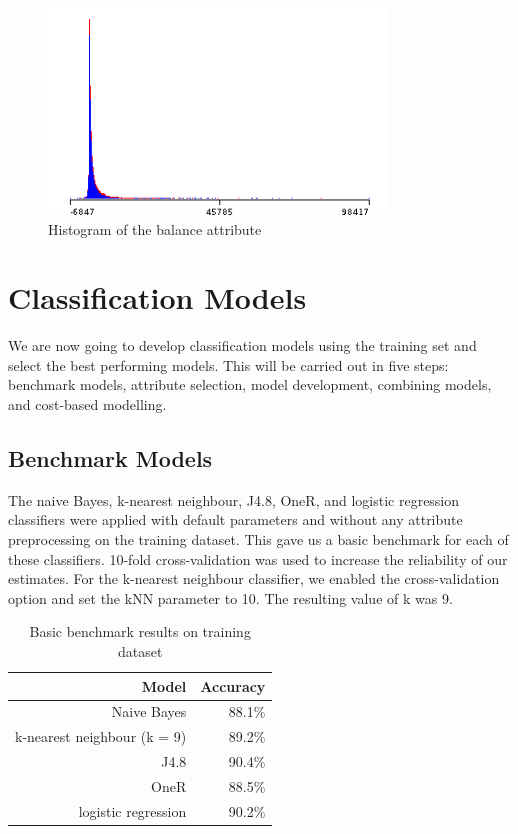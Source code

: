 \documentclass[a4paper,11pt]{article}
\begin{document}
\begin{figure}[H]
  \centering
  \includegraphics[width=0.8\textwidth]{pictures/balanceHistogram.png}
  \caption{Histogram of the balance attribute}
  \label{fig:balanceHistogram}
\end{figure}

\section{Classification Models}

We are now going to develop classification models using the training set and select the best performing models. This
will be carried out in five steps: benchmark models, attribute selection, model development, combining models, and
cost-based modelling.

\subsection{Benchmark Models}

The naive Bayes, k-nearest neighbour, J4.8, OneR, and logistic regression classifiers were applied with default parameters
and without any attribute preprocessing on the training dataset. This gave us a basic benchmark for each of these classifiers.
10-fold cross-validation was used to increase the reliability of our estimates. For the k-nearest neighbour classifier, 
we enabled the cross-validation option and set the kNN parameter to 10. The resulting value of k was 9.

\begin{table}[H]
  \begin{center}
    \begin{tabular}{r | r}
      Model & Accuracy  \\ \hline
      Naive Bayes & 88.1\% \\
      k-nearest neighbour (k = 9) & 89.2\% \\
      J4.8 & 90.4\% \\
      OneR & 88.5\% \\
      logistic regression & 90.2\% \\
    \end{tabular}
  \end{center}
  \caption{Basic benchmark results on training dataset}
  \label{tab:basicBenchmark}
\end{table}
\end{document}
